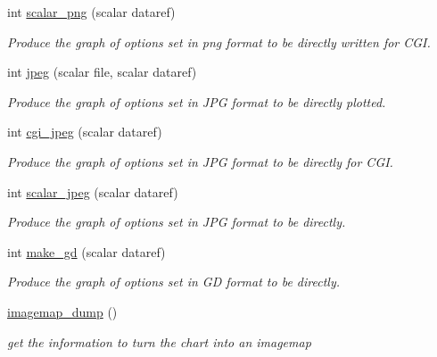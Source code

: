 \begin{DoxyCompactItemize}
int \hyperlink{classChart_1_1Base_ad6bc3855bdc31bc6e264e390f5e660c2}{scalar\_\-png} (scalar dataref)
\begin{DoxyCompactList}\small\item\em Produce the graph of options set in png format to be directly written for CGI. \item\end{DoxyCompactList}\item 
int \hyperlink{classChart_1_1Base_aa9791b8cc8b287fa966402574afaf03f}{jpeg} (scalar file, scalar dataref)
\begin{DoxyCompactList}\small\item\em Produce the graph of options set in JPG format to be directly plotted. \item\end{DoxyCompactList}\item 
int \hyperlink{classChart_1_1Base_a4bb21f030ba3e48a8a1086634595a9cf}{cgi\_\-jpeg} (scalar dataref)
\begin{DoxyCompactList}\small\item\em Produce the graph of options set in JPG format to be directly for CGI. \item\end{DoxyCompactList}\item 
int \hyperlink{classChart_1_1Base_ac5d9aee386bf811e2770574fba85ec66}{scalar\_\-jpeg} (scalar dataref)
\begin{DoxyCompactList}\small\item\em Produce the graph of options set in JPG format to be directly. \item\end{DoxyCompactList}\item 
int \hyperlink{classChart_1_1Base_aee48a95d2dbc344911ee9a4cba3b51b0}{make\_\-gd} (scalar dataref)
\begin{DoxyCompactList}\small\item\em Produce the graph of options set in GD format to be directly. \item\end{DoxyCompactList}\item 
\hyperlink{classChart_1_1Base_af9fec7910f7254177a81252a03a0f587}{imagemap\_\-dump} ()
\begin{DoxyCompactList}\small\item\em get the information to turn the chart into an imagemap \item\end{DoxyCompactList}\item 

\end{DoxyCompactItemize}
